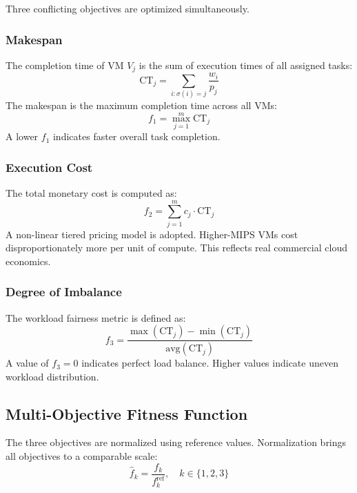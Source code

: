 \documentclass[conference]{IEEEtran}
\begin{document}
Three conflicting objectives are optimized simultaneously.

\subsubsection{Makespan}
The completion time of VM $V_j$ is the sum of execution times of all assigned tasks:
\begin{equation}
    \text{CT}_j = \sum_{i:\sigma(i)=j} \frac{w_i}{p_j}
    \label{eq:ct}
\end{equation}
The makespan is the maximum completion time across all VMs:
\begin{equation}
    f_1 = \max_{j=1}^{m} \text{CT}_j
    \label{eq:makespan}
\end{equation}
A lower $f_1$ indicates faster overall task completion.

\subsubsection{Execution Cost}
The total monetary cost is computed as:
\begin{equation}
    f_2 = \sum_{j=1}^{m} c_j \cdot \text{CT}_j
    \label{eq:cost}
\end{equation}
A non-linear tiered pricing model is adopted.
Higher-MIPS VMs cost disproportionately more per unit of compute.
This reflects real commercial cloud economics.

\subsubsection{Degree of Imbalance}
The workload fairness metric is defined as:
\begin{equation}
    f_3 = \frac{\max(\text{CT}_j) - \min(\text{CT}_j)}{\text{avg}(\text{CT}_j)}
    \label{eq:doi}
\end{equation}
A value of $f_3 = 0$ indicates perfect load balance.
Higher values indicate uneven workload distribution.


\subsection{Multi-Objective Fitness Function}

The three objectives are normalized using reference values.
Normalization brings all objectives to a comparable scale:
\begin{equation}
    \hat{f}_k = \frac{f_k}{f_k^{\text{ref}}}, \quad k \in \{1, 2, 3\}
    \label{eq:normalize}
\end{equation}
\end{document}
